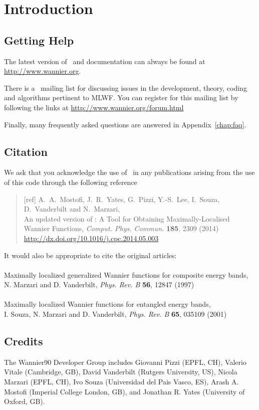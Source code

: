 \chapter*{Introduction}
\section*{Getting Help}
The latest version of \wannier\ and documentation can always
be found at \url{http://www.wannier.org}.

There is a \wannier\ mailing list for discussing issues in the
development, theory, coding and algorithms pertinent to MLWF.
You can register for this mailing list by following the links at
\url{http://www.wannier.org/forum.html}

Finally, many frequently asked questions are answered in
Appendix~\ref{chap:faq}. 

\section*{Citation}
We ask that you acknowledge the use of \wannier\ in any publications
arising from the use of this code through the following reference
\begin{quote}
[ref] A.~A.~Mostofi, J.~R.~Yates, G.~Pizzi, Y.-S.~Lee, I.~Souza, D.~Vanderbilt
and N.~Marzari,\\
An updated version of \wannier: 
A Tool for Obtaining Maximally-Localised Wannier
  Functions, {\it Comput. Phys. Commun.} {\bf 185}, 2309 (2014)\\
\url{http://dx.doi.org/10.1016/j.cpc.2014.05.003}

\end{quote}                                                              

It would also be appropriate to cite the original articles:\\\\
Maximally localized generalized Wannier functions for composite
  energy bands,\\ 
N. Marzari and D. Vanderbilt, {\it Phys. Rev. B} {\bf 56}, 12847 (1997)\\\\
Maximally localized Wannier functions for entangled energy bands,\\
I. Souza, N. Marzari and D. Vanderbilt, {\it Phys. Rev. B} {\bf 65}, 035109 (2001)


\section*{Credits}
The Wannier90 Developer Group includes Giovanni Pizzi (EPFL, CH), 
Valerio Vitale (Cambridge, GB),
David Vanderbilt  (Rutgers University, US),
Nicola Marzari    (EPFL, CH),
Ivo Souza         (Universidad del Pais Vasco, ES),
Arash A. Mostofi  (Imperial College London, GB), and 
Jonathan R. Yates (University of Oxford, GB).

